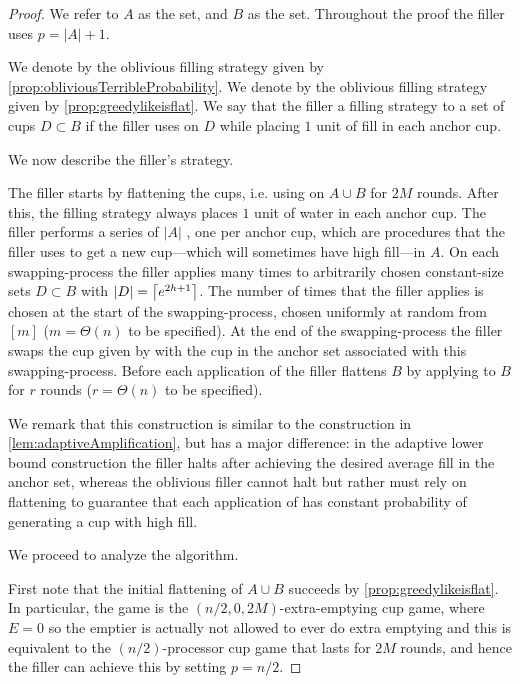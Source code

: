 \begin{proof}
  We refer to $A$ as the  set, and $B$ as the
   set.
  Throughout the proof the filler uses $p=|A|+1$.

We denote by \randalg the oblivious filling
strategy given by \cref{prop:obliviousTerribleProbability}. 
We denote by \flatalg the oblivious filling
strategy given by \cref{prop:greedylikeisflat}.
We say that the filler  a filling strategy
\genericalg to a set of cups $D \subset B$ if the filler uses
\genericalg on $D$ while placing $1$ unit of fill in each anchor cup. 

We now describe the filler's strategy.

The filler starts by flattening the cups, i.e. using \flatalg on
$A\cup B$ for $2M$ rounds. After this, the filling strategy
always places $1$ unit of water in each anchor cup. The filler
performs a series of $|A|$ , one per
anchor cup, which are procedures that the filler uses to get a
new cup---which will sometimes have high fill---in $A$. On each
swapping-process the filler applies \randalg many times to
arbitrarily chosen constant-size sets $D \subset B$ with $|D| =
\left\lceil e^{2h+1} \right\rceil$. The number of times that the filler applies
\randalg is chosen at the start of the swapping-process, chosen
uniformly at random from $[m]$ ($m = \Theta(n)$ to be
specified). At the end of the swapping-process the filler swaps
the cup given by \randalg with the cup in the anchor set
associated with this swapping-process. Before each application of
\randalg the filler flattens $B$ by applying \flatalg to $B$ for
$r$ rounds ($r=\Theta(n)$ to be specified). 

We remark that this construction is similar to
the construction in \cref{lem:adaptiveAmplification}, but has a
major difference: in the adaptive lower bound construction the
filler halts after achieving the desired average fill in the
anchor set, whereas the oblivious filler cannot halt but rather
must rely on flattening to guarantee that each application of
\randalg has constant probability of generating a cup with high
fill.

We proceed to analyze the algorithm.

First note that the initial flattening of $A\cup B$ succeeds by
\cref{prop:greedylikeisflat}. In particular, the game is the 
$(n/2, 0, 2M)$-extra-emptying cup game, where $E=0$ so the
emptier is actually not allowed to ever do extra emptying and
this is equivalent to the $(n/2)$-processor cup game that lasts
for $2M$ rounds, and hence the filler can achieve this by setting
$p=n/2$.


\end{proof}
